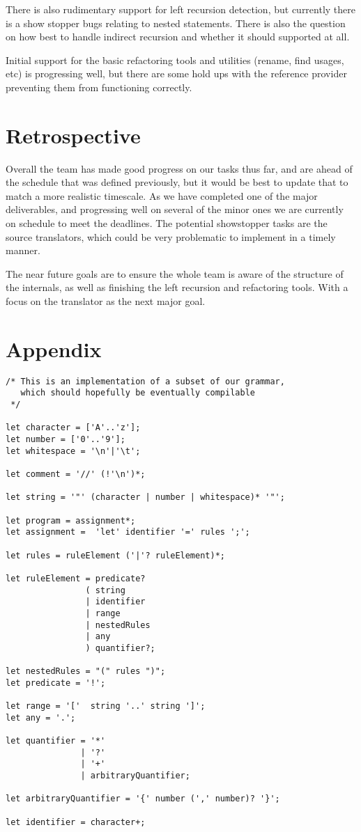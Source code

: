 \documentclass[11pt]{article}
\begin{document}
There is also rudimentary support for left recursion detection, but currently there is a show stopper bugs relating to nested statements. There is also the question on how best to handle indirect recursion and whether it should supported at all.

Initial support for the basic refactoring tools and utilities (rename, find usages, etc) is progressing well, but there are some hold ups with the reference provider preventing them from functioning correctly.

\section{Retrospective}

Overall the team has made good progress on our tasks thus far, and are ahead of the schedule that was defined previously, but it would be best to update that to match a more realistic timescale. As we have completed one of the major deliverables, and progressing well on several of the minor ones we are currently on schedule to meet the deadlines. The potential showstopper tasks are the source translators, which could be very problematic to implement in a timely manner.

The near future goals are to ensure the whole team is aware of the structure of the internals, as well as finishing the left recursion and refactoring tools. With a focus on the translator as the next major goal.

\pagebreak
\section{Appendix}

\lstset{tabsize=4}
\begin{lstlisting}
/* This is an implementation of a subset of our grammar, 
   which should hopefully be eventually compilable 
 */

let character = ['A'..'z'];
let number = ['0'..'9'];
let whitespace = '\n'|'\t';

let comment = '//' (!'\n')*;

let string = '"' (character | number | whitespace)* '"';

let program = assignment*;
let assignment =  'let' identifier '=' rules ';';

let rules = ruleElement ('|'? ruleElement)*;

let ruleElement = predicate?
	            ( string
	            | identifier
	            | range
	            | nestedRules
	            | any
	            ) quantifier?;

let nestedRules = "(" rules ")";
let predicate = '!';

let range = '['  string '..' string ']';
let any = '.';

let quantifier = '*'
	 		   | '?'
	 		   | '+'
			   | arbitraryQuantifier;

let arbitraryQuantifier = '{' number (',' number)? '}';

let identifier = character+;

\end{lstlisting}
\end{document}

